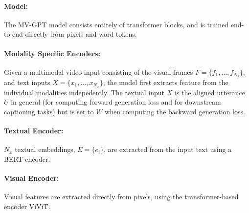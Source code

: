 \documentclass{article}
\begin{document}
\paragraph{Model:} The MV-GPT model consists entirely of transformer blocks, and is trained
end-to-end directly from pixels and word tokens.

\paragraph{Modality Specific Encoders:}Given a multimodal video input consisting of the visual frames $F = \{f_1, \ldots, f_{N_f}\}$,
and text inputs $X = \{x_1, \ldots, x_{N_x}\}$, the model first extracts feature from the individual
modalities indepedently. The textual input $X$ is the aligned utterance $U$ in general (for computing
forward generation loss and for downstream captioning tasks) but is set to $W$ when computing the
backward generation loss.
\paragraph{Textual Encoder:}$N_x$ textual embeddings, $E = \{e_i\}$, are extracted from the input
text using a BERT encoder.
\paragraph{Visual Encoder:}Visual features are extracted directly from pixels, using the transformer-based
encoder ViViT.
\end{document}
